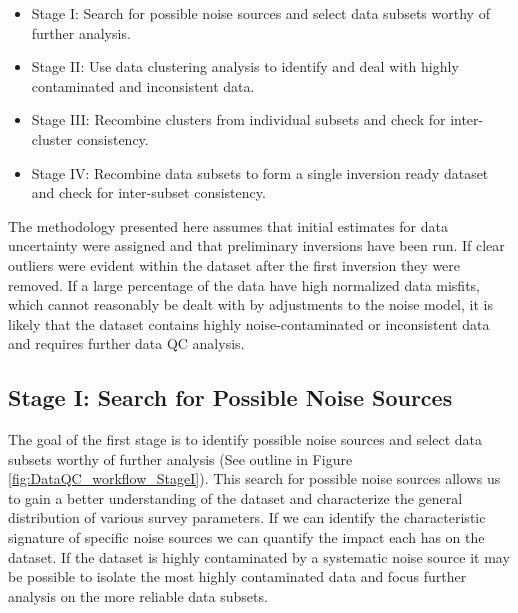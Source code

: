 \documentclass[final,authoryear,5p,times,twocolumn]{elsarticle}
\begin{document}
\begin{itemize}
    \item Stage I: Search for possible noise sources and select data subsets worthy of further analysis.
    \item Stage II: Use data clustering analysis to identify and deal with highly contaminated and inconsistent data. 
    \item Stage III: Recombine clusters from individual subsets and check for inter-cluster consistency.
    \item Stage IV: Recombine data subsets to form a single inversion ready dataset and check for inter-subset consistency.
\end{itemize}

The methodology presented here assumes that initial estimates for data uncertainty were assigned and that preliminary inversions have been run. If clear outliers were evident within the dataset after the first inversion they were removed. If a large percentage of the data have high normalized data misfits, which cannot reasonably be dealt with by adjustments to the noise model, it is likely that the dataset contains highly noise-contaminated or inconsistent data and requires further data QC analysis.

\subsection{Stage I: Search for Possible Noise Sources}
\label{Data_Quality_Control:StageI}
The goal of the first stage is to identify possible noise sources and select data subsets worthy of further analysis (See outline in Figure \ref{fig:DataQC_workflow_StageI}). This search for possible noise sources allows us to gain a better understanding of the dataset and characterize the general distribution of various survey parameters. If we can identify the characteristic signature of specific noise sources we can quantify the impact each has on the dataset. If the dataset is highly contaminated by a systematic noise source it may be possible to isolate the most highly contaminated data and focus further analysis on the more reliable data subsets. 
\end{document}

